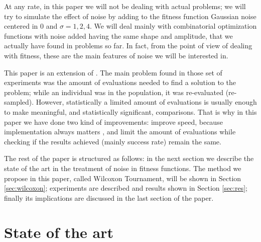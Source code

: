 \documentclass{svmult}
\begin{document}
At any rate, in this paper we will not be dealing with actual
problems; we will try to simulate the effect of noise by adding to the fitness function Gaussian noise centered in 0 and $\sigma=1,2,4$. We will deal mainly with combinatorial optimization functions with noise added having the same shape and amplitude,
that we actually have found in problems so far. In fact, from the
point of view of dealing with fitness, these are the main features of
noise we will be interested in. 

This paper is an extension of \cite{merelo14:noisy}. The main problem
found in those set of experiments was the amount of evaluations needed
to find a solution to the problem; while an individual was in the
population, it was re-evaluated (re-sampled). However, statistically a
limited amount of evaluations is usually enough to make meaningful,
and statistically significant, comparisons. That is why in this paper
we have done two kind of improvements: improve speed, because
implementation always matters
\cite{DBLP:conf/iwann/MereloRACML11},
and limit the amount of evaluations while checking if the results
achieved (mainly success rate) remain the same.  

The rest of the paper is structured as follows: in the next section we describe the
state of the art in the treatment of noise in fitness functions. The
method we propose in this paper, called Wilcoxon Tournament, will be
shown in Section \ref{sec:wilcoxon}; experiments are described and
results shown in Section \ref{sec:res}; finally its implications are discussed in the last section of the paper. 


\section{State of the art}
\label{sec:soa}
\end{document}
